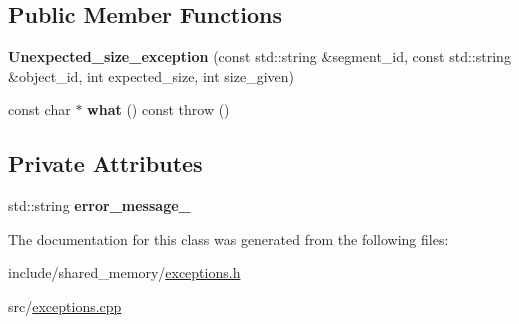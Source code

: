 \subsection*{Public Member Functions}
\begin{DoxyCompactItemize}
\item 
{\bfseries Unexpected\+\_\+size\+\_\+exception} (const std\+::string \&segment\+\_\+id, const std\+::string \&object\+\_\+id, int expected\+\_\+size, int size\+\_\+given)\hypertarget{classshared__memory_1_1Unexpected__size__exception_acc8b3dc1f6879b44e7ccd7f22d13198b}{}\label{classshared__memory_1_1Unexpected__size__exception_acc8b3dc1f6879b44e7ccd7f22d13198b}

\item 
const char $\ast$ {\bfseries what} () const   throw ()\hypertarget{classshared__memory_1_1Unexpected__size__exception_afbadf4f5340a8d20077016a57dd9414c}{}\label{classshared__memory_1_1Unexpected__size__exception_afbadf4f5340a8d20077016a57dd9414c}

\end{DoxyCompactItemize}
\subsection*{Private Attributes}
\begin{DoxyCompactItemize}
\item 
std\+::string {\bfseries error\+\_\+message\+\_\+}\hypertarget{classshared__memory_1_1Unexpected__size__exception_a6f22d0e0207e97cafe4f78192c913c55}{}\label{classshared__memory_1_1Unexpected__size__exception_a6f22d0e0207e97cafe4f78192c913c55}

\end{DoxyCompactItemize}


The documentation for this class was generated from the following files\+:\begin{DoxyCompactItemize}
\item 
include/shared\+\_\+memory/\hyperlink{exceptions_8h}{exceptions.\+h}\item 
src/\hyperlink{exceptions_8cpp}{exceptions.\+cpp}\end{DoxyCompactItemize}
